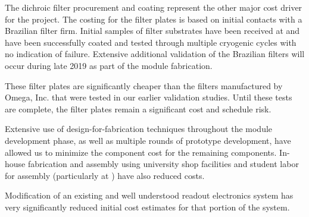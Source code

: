 The dichroic filter procurement and coating represent the other major cost driver for the project.  The costing for the filter plates is based on initial contacts with a Brazilian filter firm.  Initial samples of filter substrates have been received at  and have been successfully coated and tested through multiple cryogenic cycles with no indication of failure. Extensive additional validation of the Brazilian filters  will occur during late 2019 as part of the  module fabrication.

These filter plates are significantly cheaper than the filters manufactured by Omega, Inc. that were tested in our earlier validation studies.  Until these tests are complete, the filter plates remain a significant cost and schedule risk.

Extensive use of design-for-fabrication techniques throughout the module development phase, as well as multiple rounds of prototype development, have allowed us to minimize the component cost for the remaining components.  In-house fabrication and assembly using university shop facilities and student labor for assembly (particularly at ) have also reduced costs.

Modification of an existing and well understood readout electronics system has very significantly reduced initial cost estimates for that portion of the system.
